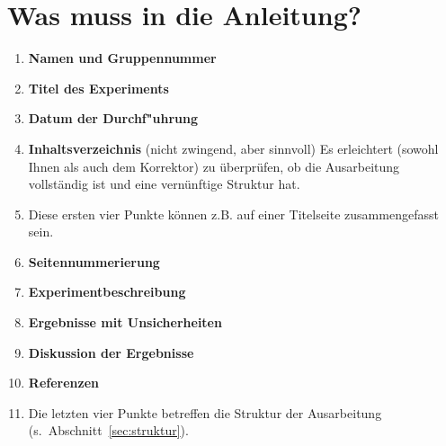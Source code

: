 \documentclass[a4paper,11pt]{article}
\begin{document}
\section{Was muss in die Anleitung?}
\begin{enumerate}
\item \textbf{Namen und Gruppennummer}\\[-2em]
\item \textbf{Titel des Experiments}\\[-2em]
\item \textbf{Datum der Durchf"uhrung}\\[-2em]
\item \textbf{Inhaltsverzeichnis} (nicht zwingend, aber sinnvoll)\newline
  Es erleichtert (sowohl Ihnen als auch dem Korrektor) zu überprüfen, 
  ob die Ausarbeitung vollständig ist und eine vernünftige Struktur hat.
\item[]\hspace*{-1.8em} Diese ersten vier Punkte können z.B. auf einer 
  Titelseite zusammengefasst sein.

\item \textbf{Seitennummerierung}

\item \textbf{Experimentbeschreibung}\\[-2em]
\item \textbf{Ergebnisse mit Unsicherheiten}\\[-2em]
\item \textbf{Diskussion der Ergebnisse}\\[-2em]
\item \textbf{Referenzen}
\item[]\hspace*{-1.8em} Die letzten vier Punkte betreffen die
   Struktur der Ausarbeitung (s.~Abschnitt~\ref{sec:struktur}).
\end{enumerate}
\end{document}

